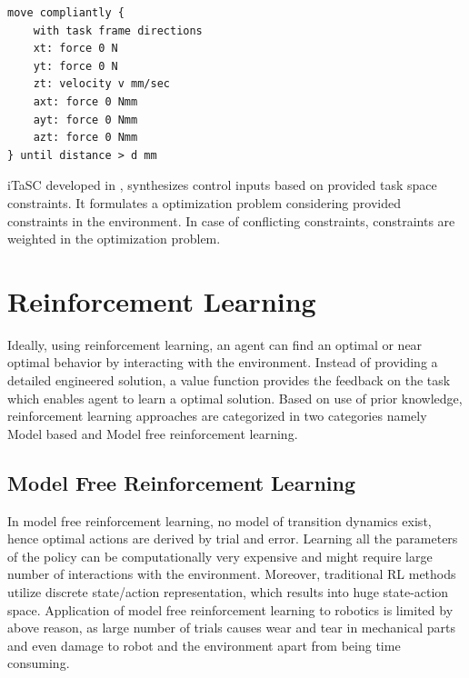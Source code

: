 \documentclass[thesis]{mas_proposal}
\begin{document}
\begin{lstlisting}[label=tff,caption=Task Specification using TFF: Open Door]
move compliantly {
	with task frame directions
	xt: force 0 N
	yt: force 0 N
	zt: velocity v mm/sec
	axt: force 0 Nmm
	ayt: force 0 Nmm
	azt: force 0 Nmm
} until distance > d mm 
\end{lstlisting}


iTaSC developed in \cite{DeSchutter-ijrr2007, DecreBruyninckxDeSchutter2013, decre09}, synthesizes control inputs based on provided task space constraints. It formulates a optimization problem considering provided constraints in the environment. In case of conflicting constraints, constraints are weighted in the optimization problem. 

\chapter{Reinforcement Learning}

Ideally, using reinforcement learning, an agent can find an optimal or near optimal behavior by interacting with the environment. Instead of providing a detailed engineered solution, a value function provides the feedback on the task which enables agent to learn a optimal solution. Based on use of prior knowledge, reinforcement learning approaches are categorized in two categories namely Model based and Model free reinforcement learning.  

\section{Model Free Reinforcement Learning}

In model free reinforcement learning, no model of transition dynamics exist, hence optimal actions are derived by trial and error\cite{polydoros2017survey}. Learning all the parameters of the policy can be computationally very expensive and might require large number of interactions with the environment. Moreover, traditional RL methods utilize discrete state/action representation, which results into huge state-action space\cite{nemec2017door}. Application of model free reinforcement learning to robotics is limited by above reason, as large number of trials causes wear and tear in mechanical parts and even damage to robot and the environment apart from being time consuming.
\end{document}

